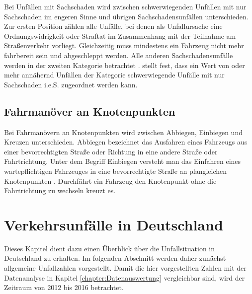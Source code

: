 Bei Unfällen mit Sachschaden wird zwischen schwerwiegenden Unfällen mit nur Sachschaden im engeren Sinne und übrigen Sachschadensunfällen unterschieden. Zur ersten Position zählen alle Unfälle, bei denen als Unfallursache eine Ordnungswidrigkeit oder Straftat im Zusammenhang mit der Teilnahme am Straßenverkehr vorliegt. Gleichzeitig muss mindestens ein Fahrzeug nicht mehr fahrbereit sein und abgeschleppt werden. Alle anderen Sachschadensunfälle werden in der zweiten Kategorie betrachtet \parencite[S. 12]{StatistischesBundesamt.2018b}. \Textcite[S. 23]{Vollrath.2006} stellt fest, dass ein Wert von  oder mehr annähernd Unfällen der Kategorie schwerwiegende Unfälle mit nur Sachschaden i.e.S. zugeordnet werden kann.

\subsection{Fahrmanöver an Knotenpunkten}
Bei Fahrmanövern an Knotenpunkten wird zwischen Abbiegen, Einbiegen und Kreuzen unterschieden. Abbiegen bezeichnet das Ausfahren eines Fahrzeugs aus einer bevorrechtigten Straße oder Richtung in eine andere Straße oder Fahrtrichtung. Unter dem Begriff Einbiegen versteht man das Einfahren eines wartepflichtigen Fahrzeuges in eine bevorrechtigte Straße an plangleichen Knotenpunkten \parencite[S. 90f]{ForschungsgesellschaftfurStraenundVerkehrswesen.2012b}. Durchfährt ein Fahrzeug den Knotenpunkt ohne die Fahrtrichtung zu wechseln kreuzt es.

\section{Verkehrsunfälle in Deutschland}\label{chapter:Verkehrsunfälle in Deutschland}
Dieses Kapitel dient dazu einen Überblick über die Unfallsituation in Deutschland zu erhalten. Im folgenden Abschnitt werden daher zunächst allgemeine Unfallzahlen vorgestellt. Damit die hier vorgestellten Zahlen mit der Datenanalyse in Kapitel \ref{chapter:Datenauswertung} vergleichbar sind, wird der Zeitraum von 2012 bis 2016 betrachtet.

